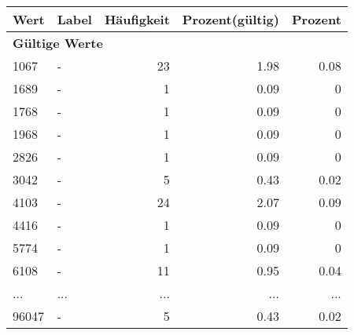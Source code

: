      \begin{longtable}{lXrrr}
     \toprule
     \textbf{Wert} & \textbf{Label} & \textbf{Häufigkeit} & \textbf{Prozent(gültig)} & \textbf{Prozent} \\
     \endhead
     \midrule
     \multicolumn{5}{l}{\textbf{Gültige Werte}}\\
        1067 & \multicolumn{1}{X}{-} & %
          \num{23} &
          \num[round-mode=places,round-precision=2]{1.98} &
          \num[round-mode=places,round-precision=2]{0.08} \\
        1689 & \multicolumn{1}{X}{-} & %
          \num{1} &
          \num[round-mode=places,round-precision=2]{0.09} &
          \num[round-mode=places,round-precision=2]{0} \\
        1768 & \multicolumn{1}{X}{-} & %
          \num{1} &
          \num[round-mode=places,round-precision=2]{0.09} &
          \num[round-mode=places,round-precision=2]{0} \\
        1968 & \multicolumn{1}{X}{-} & %
          \num{1} &
          \num[round-mode=places,round-precision=2]{0.09} &
          \num[round-mode=places,round-precision=2]{0} \\
        2826 & \multicolumn{1}{X}{-} & %
          \num{1} &
          \num[round-mode=places,round-precision=2]{0.09} &
          \num[round-mode=places,round-precision=2]{0} \\
        3042 & \multicolumn{1}{X}{-} & %
          \num{5} &
          \num[round-mode=places,round-precision=2]{0.43} &
          \num[round-mode=places,round-precision=2]{0.02} \\
        4103 & \multicolumn{1}{X}{-} & %
          \num{24} &
          \num[round-mode=places,round-precision=2]{2.07} &
          \num[round-mode=places,round-precision=2]{0.09} \\
        4416 & \multicolumn{1}{X}{-} & %
          \num{1} &
          \num[round-mode=places,round-precision=2]{0.09} &
          \num[round-mode=places,round-precision=2]{0} \\
        5774 & \multicolumn{1}{X}{-} & %
          \num{1} &
          \num[round-mode=places,round-precision=2]{0.09} &
          \num[round-mode=places,round-precision=2]{0} \\
        6108 & \multicolumn{1}{X}{-} & %
          \num{11} &
          \num[round-mode=places,round-precision=2]{0.95} &
          \num[round-mode=places,round-precision=2]{0.04} \\
       ... & ... & ... & ... & ... \\
        96047 & \multicolumn{1}{X}{-} & %
          \num{5} &
          \num[round-mode=places,round-precision=2]{0.43} &
          \num[round-mode=places,round-precision=2]{0.02} \\


\end{longtable}
